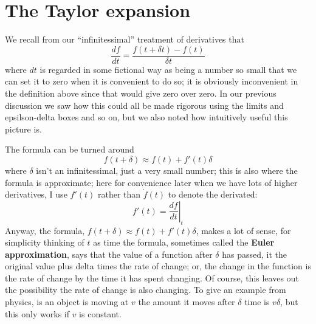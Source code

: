 \documentclass[12pt]{article}
\begin{document}
\section*{The Taylor expansion}

We recall from our ``infinitessimal'' treatment of derivatives that
\begin{equation}
  \frac{df}{dt}=\frac{f(t+\delta t)-f(t)}{\delta t}
\end{equation}
where $dt$ is regarded in some fictional way as being a number so
small that we can set it to zero when it is convenient to do so; it is
obviously inconvenient in the definition above since that would give
zero over zero. In our previous discussion we saw how this could all
be made rigorous using the limits and epsilson-delta boxes and so on,
but we also noted how intuitively useful this picture is.

The formula can be turned around
\begin{equation}
  f(t+\delta)\approx f(t)+f'(t)\delta
\end{equation}
where $\delta$ isn't an infinitessimal, just a very small number; this
is also where the formula is approximate; here for convenience later when we have lots of higher derivatives, I use $f'(t)$ rather than $\dot{f}(t)$ to denote the derivated:
\begin{equation}
  f'(t)=\left.\frac{df}{dt}\right|_t
\end{equation}
Anyway, the formula, $f(t+\delta)\approx f(t)+f'(t)\delta$, makes a
lot of sense, for simplicity thinking of $t$ as time the formula,
sometimes called the \textbf{Euler approximation}, says that the value
of a function after $\delta$ has passed, it the original value plus
delta times the rate of change; or, the change in the function is the
rate of change by the time it has spent changing. Of course, this
leaves out the possibility the rate of change is also changing. To
give an example from physics, is an object is moving at $v$ the amount
it moves after $\delta$ time is $v\delta$, but this only works if $v$
is constant.
\end{document}
